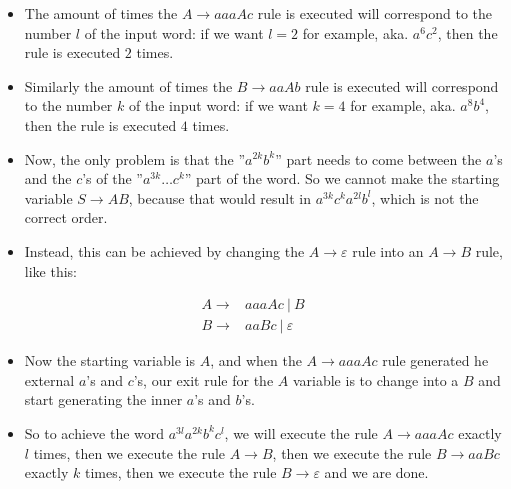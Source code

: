 \begin{itemize}
    \item The amount of times the $A \rightarrow aaaAc$ rule is executed will correspond to the number $l$ of the input word: if we want $l=2$ for example, aka. $a^{6}c^{2}$, then the rule is executed $2$ times.
    \item Similarly the amount of times the $B \rightarrow aaAb$ rule is executed will correspond to the number $k$ of the input word: if we want $k=4$ for example, aka. $a^{8}b^{4}$, then the rule is executed $4$ times.
    \item Now, the only problem is that the ''$a^{2k}b^k$'' part needs to come between the $a$'s and the $c$'s of the ''$a^{3k}\dots{}c^k$'' part of the word. So we cannot make the starting variable $S \rightarrow AB$, because that would result in $a^{3k}c^{k}a^{2l}b^{l}$, which is not the correct order.
    \item Instead, this can be achieved by changing the $A \rightarrow \varepsilon$ rule into an $A \rightarrow B$ rule, like this:
\end{itemize}

\begin{align*}
A \rightarrow& aaaAc ~|~ B \\
B \rightarrow& aaBc ~|~ \varepsilon
\end{align*}

\begin{itemize}
    \item Now the starting variable is $A$, and when the $A \rightarrow aaaAc$ rule generated he external $a$'s and $c$'s, our exit rule for the $A$ variable is to change into a $B$ and start generating the inner $a$'s and $b$'s.
    \item So to achieve the word $a^{3l}a^{2k}b^{k}c^{l}$, we will execute the rule $A \rightarrow aaaAc$ exactly $l$ times, then we execute the rule $A\rightarrow B$, then we execute the rule $B \rightarrow aaBc$ exactly $k$ times, then we execute the rule $B \rightarrow \varepsilon$ and we are done.
\end{itemize}